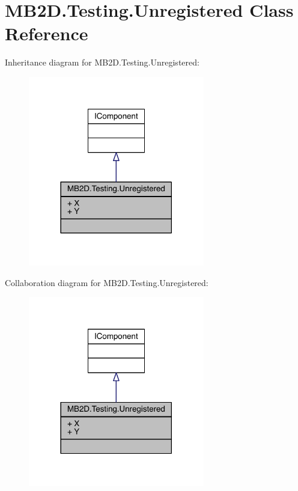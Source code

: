 \hypertarget{class_m_b2_d_1_1_testing_1_1_unregistered}{}\section{M\+B2\+D.\+Testing.\+Unregistered Class Reference}
\label{class_m_b2_d_1_1_testing_1_1_unregistered}


Inheritance diagram for M\+B2\+D.\+Testing.\+Unregistered\+:\nopagebreak
\begin{figure}[H]
\begin{center}
\leavevmode
\includegraphics[width=218pt]{class_m_b2_d_1_1_testing_1_1_unregistered__inherit__graph}
\end{center}
\end{figure}


Collaboration diagram for M\+B2\+D.\+Testing.\+Unregistered\+:\nopagebreak
\begin{figure}[H]
\begin{center}
\leavevmode
\includegraphics[width=218pt]{class_m_b2_d_1_1_testing_1_1_unregistered__coll__graph}
\end{center}
\end{figure}
